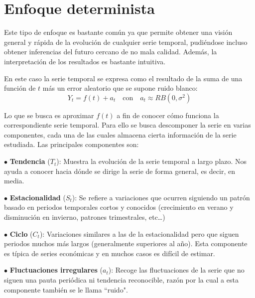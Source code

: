 

\section{Enfoque determinista}

Este tipo de enfoque es bastante común ya que permite obtener una visión general y rápida de la evolución de cualquier serie temporal, pudiéndose incluso obtener inferencias del futuro cercano de no mala calidad. Además, la interpretación de los resultados es bastante intuitiva.

En este caso la serie temporal se expresa como el resultado de la suma de una función de $t$ más un error aleatorio que se supone ruido blanco:
\begin{equation}
    Y_{t} = f(t) + a_t \quad \text{con} \quad a_t \approx RB(0, \sigma^2)
\end{equation}

Lo que se busca es aproximar $f(t)$ a fin de conocer cómo funciona la correspondiente serie temporal. Para ello se busca descomponer la serie en varias componentes, cada una de las cuales almacena cierta información de la serie estudiada.  Las principales componentes son:

\begin{itemize*}
  \item[$\bullet$] \textbf{Tendencia} ($T_t$): Muestra la evolución de la serie temporal a largo plazo. Nos ayuda a conocer hacia dónde se dirige la serie de forma general, es decir, en media.
  \item[$\bullet$] \textbf{Estacionalidad} ($S_t$): Se refiere a variaciones que ocurren siguiendo un patrón basado en periodos temporales cortos y conocidos (crecimiento en verano y disminución en invierno, patrones trimestrales, etc…)
  \item[$\bullet$] \textbf{Ciclo} ($C_t$): Variaciones similares a las de la estacionalidad pero que siguen periodos muchos más largos (generalmente superiores al año). Esta componente es típica de series económicas y en muchos casos es difícil de estimar.
  \item[$\bullet$] \textbf{Fluctuaciones irregulares} ($a_t$): Recoge las fluctuaciones de la serie que no siguen una pauta periódica ni tendencia reconocible, razón por la cual a esta componente también se le llama ``ruido".
\end{itemize*}

